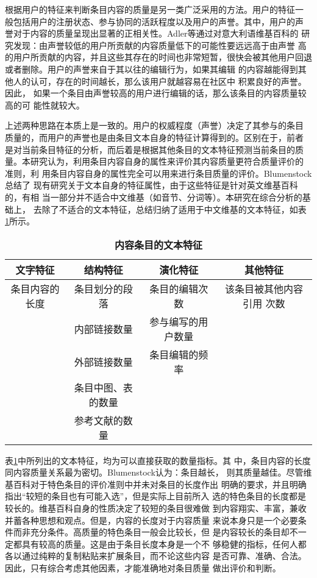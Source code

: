 根据用户的特征来判断条目内容的质量是另一类广泛采用的方法。用户的特征一
般包括用户的注册状态、参与协同的活跃程度以及用户的声誉。其中，用户的声
誉对于内容的质量呈现出显著的正相关性。Adler等通过对意大利语维基百科的
研究发现：由声誉较低的用户所贡献的内容质量低下的可能性要远远高于由声誉
高的用户所贡献的内容，并且这些其存在的时间也非常短暂，很快会被其他用户回退
或者删除\cite{Adler2008}。用户的声誉来自于其以往的编辑行为，如果其编辑
的内容越能得到其他人的认可，存在的时间越长，那么该用户就越容易在社区中
积累良好的声誉。因此，
如果一个条目由声誉较高的用户进行编辑的话，那么该条目的内容质量较高的可
能性就较大。

上述两种思路在本质上是一致的。用户的权威程度（声誉）决定了其参与的条目
质量的，而用户的声誉也是由条目文本自身的特征计算得到的。区别在于，前者
是对当前条目特征的分析，而后着是根据其他条目的文本特征预测当前条目的质
量。本研究认为，利用条目内容自身的属性来评价其内容质量更符合质量评价的
准则，利
用条目内容自身的属性完全可以用来进行条目质量的评价。Blumenstock总结了
现有研究关于文本自身的特征属性，由于这些特征是针对英文维基百科的，有相
当一部分并不适合中文维基（如音节、分词等）。本研究在综合分析的基础上，
去除了不适合的文本特征，总结归纳了适用于中文维基的文本特征，如表
\ref{text-feature}所示。
\begin{table}[!htb]
  \centering
\small
\caption{\small{\bf{内容条目的文本特征}}} 
 \begin{tabular}{|c|c|c|c|}
 \hline
    文字特征&结构特征&演化特征&其他特征\\\hline
    条目内容的长度&条目划分的段落&条目的编辑次数&该条目被其他内容引用
    次数\\
 &内部链接数量&参与编写的用户数量&\\
 &外部链接数量&条目编辑的频率& \\
 &条目中图、表的数量& &\\
  &参考文献的数量&& \\\hline
  \end{tabular}
  
  \label{text-feature}
\end{table}

表\ref{text-feature}中所列出的文本特征，均为可以直接获取的数量指标。其
中，条目内容的长度同内容质量关系最为密切。Blumenstock认为：条目越长，
则其质量越佳。尽管维基百科对于特色条目的评价准则中并未对条目的长度作出
明确的要求，并且明确指出“较短的条目也有可能入选”，但是实际上目前所入
选的特色条目的长度都是较长的。维基百科自身的性质决定了较短的条目很难做
到内容翔实、丰富，兼收并蓄各种思想和观点。但是，内容的长度对于内容质量
来说本身只是一个必要条件而非充分条件。高质量的特色条目一般会比较长，但
是内容较长的条目却不一定都具有较高的质量。这是由于条目长度本身是一个不
够稳健的指标，任何人都各以通过纯粹的复制粘贴来扩展条目，而不论这些内容
是否可靠、准确、合法。因此，只有综合考虑其他因素，才能准确地对条目质量
做出评价和判断。

